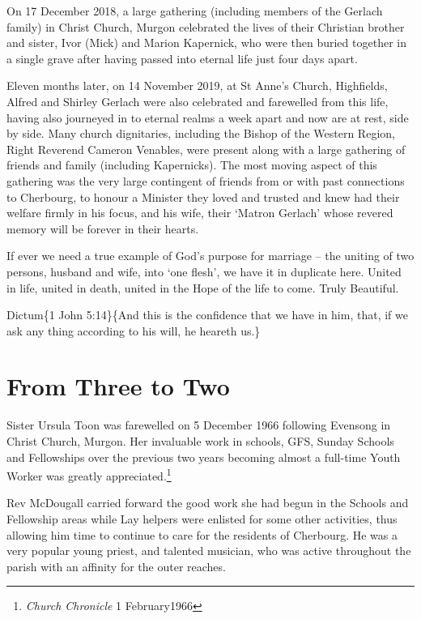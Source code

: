 On 17 December 2018, a large gathering (including members of the Gerlach family) in Christ Church, Murgon celebrated the lives of their Christian brother and sister, Ivor (Mick) and Marion Kapernick, who were then buried together in a single grave after having passed into eternal life just four days apart.

Eleven months later, on 14 November 2019, at St Anne's Church, Highfields, Alfred and Shirley Gerlach were also celebrated and farewelled from this life, having also journeyed in to eternal realms a week apart and now are at rest, side by side. Many church dignitaries, including the Bishop of the Western Region, Right Reverend Cameron Venables, were present along with a large gathering of friends and family (including Kapernicks). The most moving aspect of this gathering was the very large contingent of friends from or with past connections to Cherbourg, to honour a Minister they loved and trusted and knew had their welfare firmly in his focus, and his wife, their `Matron Gerlach' whose revered memory will be forever in their hearts.

If ever we need a true example of God's purpose for marriage -- the uniting of two persons, husband and wife, into `one flesh', we have it in duplicate here. United in life, united in death, united in the Hope of the life to come. Truly Beautiful.

Dictum\{1 John 5:14\}\{And this is the confidence that we have in him, that, if we ask any thing according to his will, he heareth us.\}

\hypertarget{from-three-to-two}{%
\section{From Three to Two}\label{from-three-to-two}}

Sister Ursula Toon was farewelled on 5 December 1966 following Evensong in Christ Church, Murgon. Her invaluable work in schools, GFS, Sunday Schools and Fellowships over the previous two years becoming almost a full-time Youth Worker was greatly appreciated.\footnote{\emph{Church Chronicle} 1 February1966}

Rev McDougall carried forward the good work she had begun in the Schools and Fellowship areas while Lay helpers were enlisted for some other activities, thus allowing him time to continue to care for the residents of Cherbourg. He was a very popular young priest, and talented musician, who was active throughout the parish with an affinity for the outer reaches.

